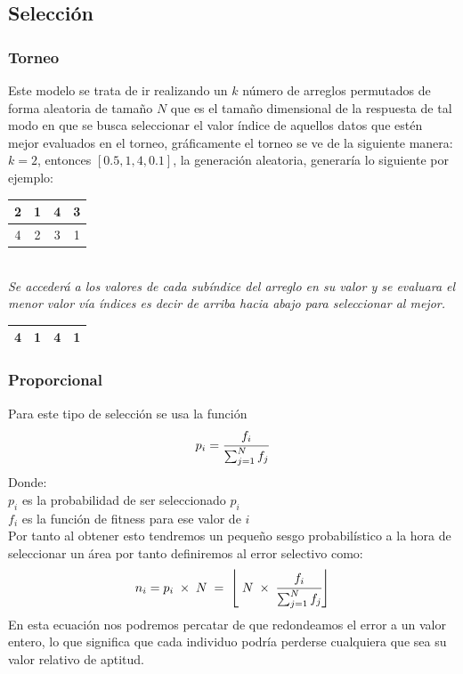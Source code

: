 \documentclass[10pt]{article}
\begin{document}
\subsection{Selección}
\subsubsection{Torneo}
Este modelo se trata de ir realizando un $k$ número de arreglos permutados de forma aleatoria de tamaño $N$ que es el tamaño dimensional de la respuesta de tal modo en que se busca seleccionar el valor índice de aquellos datos que estén mejor evaluados en el torneo, gráficamente el torneo se ve de la siguiente manera:\\
\(\displaystyle k=2\), entonces \(\displaystyle [0.5,1,4,0.1]\), la generación aleatoria, generaría lo siguiente por ejemplo:\\
\begin{center}
  \begin{tabular}{|c|c|c|c|}
    \hline
    2&1&4&3\\
    \hline
    4&2&3&1\\
    \hline
  \end{tabular}\\
  \textit{Se accederá a los valores de cada subíndice del arreglo en su valor y se evaluara el menor valor vía índices es decir de arriba hacia abajo para seleccionar al mejor.}\\
  \begin{tabular}{|c|c|c|c|}
    \hline
    4&1&4&1\\
    \hline
  \end{tabular}
\end{center}

\subsubsection{Proporcional}
Para este tipo de selección se usa la función
\[p_{i}=\cfrac{f_{i}}{\sum_{j=1}^{N}f_{j}}\]
Donde:\\
\(\displaystyle p_i\) es la probabilidad de ser seleccionado \(\displaystyle p_{i}\)\\\vspace{0.25cm}
\(\displaystyle f_{i}\) es la función de fitness para ese valor de \(\displaystyle i\)\\\vspace{0.25cm}
Por tanto al obtener esto tendremos un pequeño sesgo probabilístico a la hora de seleccionar un área por tanto definiremos al error selectivo como:
\[n_{i}=p_i\;\times\;N\;=\;\left\lfloor\;N\;\times\;\cfrac{f_{i}}{\sum_{j=1}^{N}f_{j}}\right\rfloor\]
En esta ecuación nos podremos percatar de que redondeamos el error a un valor entero, lo que significa que cada individuo podría perderse cualquiera que sea su valor relativo de aptitud.
\end{document}
